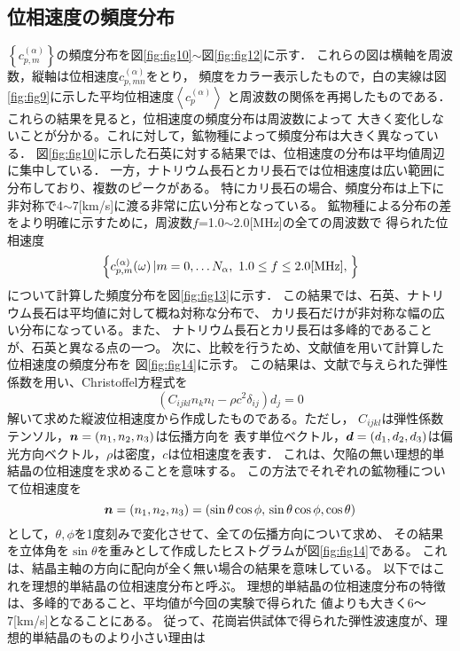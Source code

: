 \subsection{位相速度の頻度分布}
$\left\{ c^{(\alpha)}_{p,m}\right\}$の頻度分布を図\ref{fig:fig10}$\sim$図\ref{fig:fig12}に示す．
これらの図は横軸を周波数，縦軸は位相速度$c^{(\alpha)}_{p,mn}$をとり，
頻度をカラー表示したもので，白の実線は図\ref{fig:fig9}に示した平均位相速度$\left<c^{(\alpha)}_p\right>$
と周波数の関係を再掲したものである．これらの結果を見ると，位相速度の頻度分布は周波数によって
大きく変化しないことが分かる。これに対して，鉱物種によって頻度分布は大きく異なっている．
図\ref{fig:fig10}に示した石英に対する結果では、位相速度の分布は平均値周辺に集中している．
一方，ナトリウム長石とカリ長石では位相速度は広い範囲に分布しており、複数のピークがある。
特にカリ長石の場合、頻度分布は上下に非対称で4$\sim$7[km/s]に渡る非常に広い分布となっている。
鉱物種による分布の差をより明確に示すために，周波数$f$=1.0$\sim$2.0[MHz]の全ての周波数で
得られた位相速度
\[
	\left\{ c_{p,m}^{(\alpha)}(\omega)\left| m=0,\dots N_\alpha ,\ 1.0\leq f \leq 2.0[{\rm MHz}], \right.\right\}
\]
について計算した頻度分布を図\ref{fig:fig13}に示す．
この結果では、石英、ナトリウム長石は平均値に対して概ね対称な分布で、
カリ長石だけが非対称な幅の広い分布になっている。また、
ナトリウム長石とカリ長石は多峰的であることが、石英と異なる点の一つ。
次に、比較を行うため、文献値を用いて計算した位相速度の頻度分布を
図\ref{fig:fig14}に示す。
この結果は、文献で与えられた弾性係数を用い、Christoffel方程式を
\begin{equation}
	\left( C_{ijkl}n_kn_l-\rho c^2\delta _{ij}\right)d_j =0
\end{equation}
解いて求めた縦波位相速度から作成したものである。ただし，
$C_{ijkl}$は弾性係数テンソル，$\mbox{\boldmath{$n$}}=(n_1,n_2,n_3)$は伝播方向を
表す単位ベクトル，$\mbox{\boldmath{$d$}}=(d_1,d_2,d_3)$は偏光方向ベクトル，$\rho$は密度，$c$は位相速度を表す．
これは、欠陥の無い理想的単結晶の位相速度を求めることを意味する。
この方法でそれぞれの鉱物種について位相速度を
\[
	\mbox{\boldmath{$n$}}=(n_1,n_2,n_3)=(\sin\theta\cos\phi,\, \sin\theta\cos\phi, \cos\theta)
\]
として，$\theta,\phi$を1度刻みで変化させて、全ての伝播方向について求め、
その結果を立体角を$\sin\theta$を重みとして作成したヒストグラムが図\ref{fig:fig14}である。
これは、結晶主軸の方向に配向が全く無い場合の結果を意味している。
以下ではこれを理想的単結晶の位相速度分布と呼ぶ。
理想的単結晶の位相速度分布の特徴は、多峰的であること、平均値が今回の実験で得られた
値よりも大きく6〜7[km/s]となることにある。
従って、花崗岩供試体で得られた弾性波速度が、理想的単結晶のものより小さい理由は
